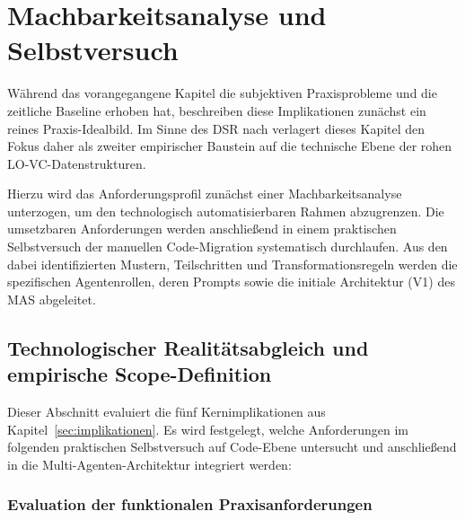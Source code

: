 \chapter{Machbarkeitsanalyse und Selbstversuch}
\label{ch:explorative_fallstudie}

Während das vorangegangene Kapitel die subjektiven Praxisprobleme und die zeitliche Baseline erhoben hat, beschreiben diese Implikationen zunächst ein reines Praxis-Idealbild. Im Sinne des \ac{DSR} nach \textcite{hevnerDesignScienceInformation2004} verlagert dieses Kapitel den Fokus daher als zweiter empirischer Baustein auf die technische Ebene der rohen \ac{LO-VC}-Datenstrukturen.

Hierzu wird das Anforderungsprofil zunächst einer Machbarkeitsanalyse unterzogen, um den technologisch automatisierbaren Rahmen abzugrenzen. Die umsetzbaren Anforderungen werden anschließend in einem praktischen Selbstversuch der manuellen Code-Migration systematisch durchlaufen. Aus den dabei identifizierten Mustern, Teilschritten und Transformationsregeln werden die spezifischen Agentenrollen, deren Prompts sowie die initiale Architektur (V1) des \ac{MAS} abgeleitet.
\section{Technologischer Realitätsabgleich und empirische Scope-Definition}
\label{sec:scope_abgrenzung}

Dieser Abschnitt evaluiert die fünf Kernimplikationen aus Kapitel~\ref{sec:implikationen}. Es wird festgelegt, welche Anforderungen im folgenden praktischen Selbstversuch auf Code-Ebene untersucht und anschließend in die Multi-Agenten-Architektur integriert werden:

\subsection{Evaluation der funktionalen Praxisanforderungen}

